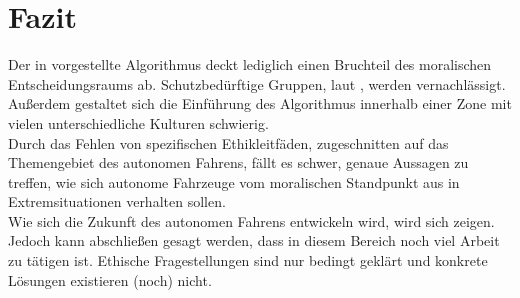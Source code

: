 \section{Fazit}
\label{sec:fazit}

Der in \citeauthor{votingBasedSystem} vorgestellte Algorithmus deckt lediglich einen Bruchteil des moralischen Entscheidungsraums ab. Schutzbedürftige Gruppen, laut \cite{ec2019ethics}, werden vernachlässigt. Außerdem gestaltet sich die Einführung des Algorithmus innerhalb einer Zone mit vielen unterschiedliche Kulturen schwierig.\\

Durch das Fehlen von spezifischen Ethikleitfäden, zugeschnitten auf das Themengebiet des autonomen Fahrens, fällt es schwer, genaue Aussagen zu treffen, wie sich autonome Fahrzeuge vom moralischen Standpunkt aus in Extremsituationen verhalten sollen.\\

Wie sich die Zukunft des autonomen Fahrens entwickeln wird, wird sich zeigen. Jedoch kann abschließen gesagt werden, dass in diesem Bereich noch viel Arbeit zu tätigen ist. Ethische Fragestellungen sind nur bedingt geklärt und konkrete Lösungen existieren (noch) nicht.